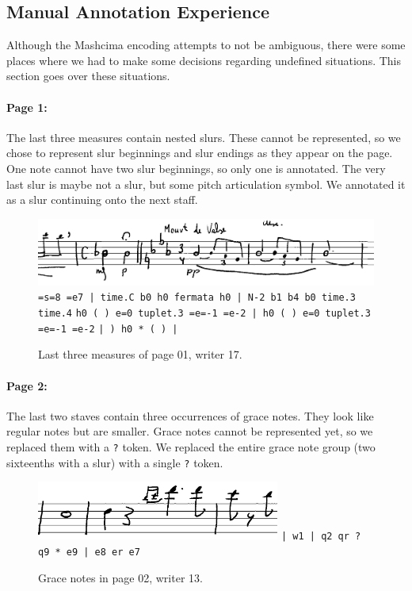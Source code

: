 \subsection{Manual Annotation Experience}
\label{sec:ManualAnnotationExperience}

Although the Mashcima encoding attempts to not be ambiguous, there were some places where we had to make some decisions regarding undefined situations. This section goes over these situations.

\paragraph{Page 1:} The last three measures contain nested slurs. These cannot be represented, so we chose to represent slur beginnings and slur endings as they appear on the page. One note cannot have two slur beginnings, so only one is annotated. The very last slur is maybe not a slur, but some pitch articulation symbol. We annotated it as a slur continuing onto the next staff.

\begin{figure}[h]
    \centering
    \includegraphics[width=140mm]{../img/ae-01}
    \verb`=s=8 =e7 | time.C b0 h0 fermata h0 | N-2 b1 b4 b0 time.3 time.4`
    \verb`h0 ( ) e=0 tuplet.3 =e=-1 =e-2 | h0 ( ) e=0 tuplet.3 =e=-1 =e-2`
    \verb`| ) h0 * ( ) |`
    \caption{Last three measures of page 01, writer 17.}
    \label{fig6:AnnotationExperience01}
\end{figure}

\paragraph{Page 2:} The last two staves contain three occurrences of grace notes. They look like regular notes but are smaller. Grace notes cannot be represented yet, so we replaced them with a \verb`?` token. We replaced the entire grace note group (two sixteenths with a slur) with a single \verb`?` token.

\begin{figure}[h]
    \centering
    \includegraphics[width=80mm]{../img/ae-02}
    \verb`| w1 | q2 qr ? q9 * e9 | e8 er e7`
    \caption{Grace notes in page 02, writer 13.}
    \label{fig6:AnnotationExperience02}
\end{figure}

